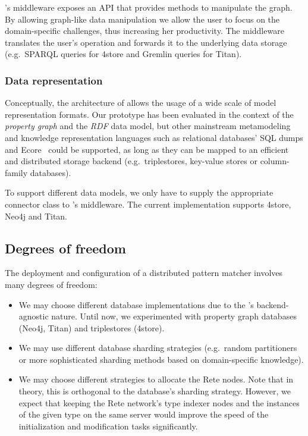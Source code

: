 \iqd{}'s middleware exposes an API that provides methods to manipulate the graph. By allowing graph-like data manipulation we allow the user to focus on the domain-specific challenges, thus increasing her productivity. The middleware translates the user's operation and forwards it to the underlying data storage (e.g.\ SPARQL queries for 4store and Gremlin queries for Titan).

\subsubsection{Data representation}

Conceptually, the architecture of \iqd{} allows the usage of a wide scale of model representation formats. Our prototype has been evaluated in the context of the \emph{property graph} and the \emph{RDF} data model, but other mainstream metamodeling and knowledge representation languages such as relational databases' SQL dumps and Ecore~\cite{EMF} could be supported, as long as they can be mapped to an efficient and distributed storage backend (e.g.\ triplestores, key-value stores or column-family databases).

To support different data models, we only have to supply the appropriate connector class to \iqd{}'s middleware. The current implementation supports 4store, Neo4j and Titan. %


\subsection{Degrees of freedom}

The deployment and configuration of a distributed pattern matcher involves many degrees of freedom:

\begin{itemize}
  \item We may choose different database implementations due to the \iqd{}'s backend-agnostic nature. Until now, we experimented with property graph databases (Neo4j, Titan) and triplestores (4store).
  \item We may use different database sharding strategies (e.g.\ random partitioners or more sophisticated sharding methods based on domain-specific knowledge).
  \item We may choose different strategies to allocate the Rete nodes. Note that in theory, this is orthogonal to the database's sharding strategy. However, we expect that keeping the Rete network's type indexer nodes and the instances of the given type on the same server would improve the speed of the initialization and modification tasks significantly.
\end{itemize}

